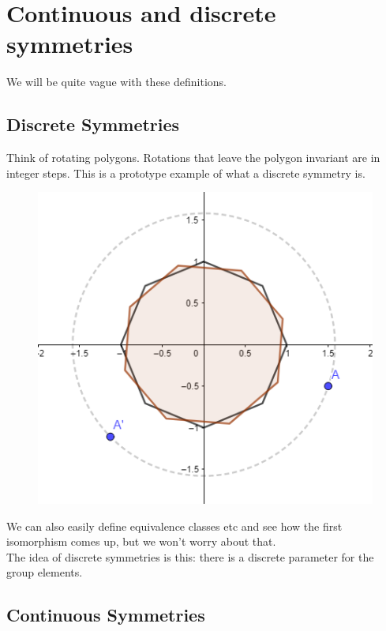 \documentclass{book}
\theoremstyle{definition}
\begin{document}
\section{Continuous and discrete symmetries}

We will be quite vague with these definitions. 



\subsection{Discrete Symmetries}


Think of rotating polygons. Rotations that leave the polygon invariant are in integer steps. This is a prototype example of what a discrete symmetry is. 

\begin{figure}[!htb]
	\centering
	\includegraphics[scale=0.5]{polys}
\end{figure}

We can also easily define equivalence classes etc and see how the first isomorphism comes up, but we won't worry about that. \\

The idea of discrete symmetries is this: there is a discrete parameter for the group elements. 






\subsection{Continuous Symmetries}
\end{document}

